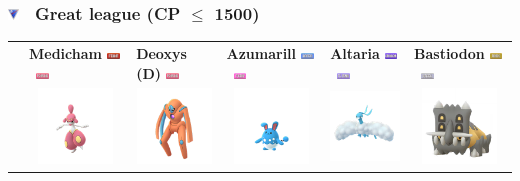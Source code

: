 \documentclass[8pt,aspectratio=169,compress]{beamer}
\newcommand{\fightingfull}{\includegraphics[height=0.15cm]{../../images/type/full/Fighting.png}}
\newcommand{\fairyfull}{\includegraphics[height=0.15cm]{../../images/type/full/Fairy.png}}
\newcommand{\flyingfull}{\includegraphics[height=0.15cm]{../../images/type/full/Flying.png}}
\newcommand{\dragonfull}{\includegraphics[height=0.15cm]{../../images/type/full/Dragon.png}}
\newcommand{\psychicfull}{\includegraphics[height=0.15cm]{../../images/type/full/Psychic.png}}
\newcommand{\rockfull}{\includegraphics[height=0.15cm]{../../images/type/full/Rock.png}}
\newcommand{\waterfull}{\includegraphics[height=0.15cm]{../../images/type/full/Water.png}}
\newcommand{\steelfull}{\includegraphics[height=0.15cm]{../../images/type/full/Steel.png}}
\begin{document}
\begin{frame}
\frametitle{\includegraphics[width=0.3cm]{../../pve/guide/great_league.png} ~Great league (CP $\leq$ 1500)}

\begin{tiny}
\begin{block}{}
\begin{center}

\begin{tabular}{rp{2cm}p{2cm}p{2cm}p{2cm}p{2cm}} 
  & \textbf{Medicham} \hfill \fightingfull~\psychicfull& \textbf{Deoxys (D)} \hfill \psychicfull & \textbf{Azumarill} \hfill\waterfull~\fairyfull &\textbf{Altaria} \hfill\dragonfull~\flyingfull &\textbf{Bastiodon} \hfill\rockfull~\steelfull  \\ 
  & \multicolumn{1}{c}{\includegraphics[width=2cm]{../../images/pokemon/medicham}} &  \multicolumn{1}{c}{\includegraphics[width=2cm]{../../images/pokemon/deoxys_d} } & \multicolumn{1}{c}{\includegraphics[width=2cm]{../../images/pokemon/azumarill} } & \multicolumn{1}{c}{\includegraphics[width=2cm]{../../images/pokemon/altaria} } & \multicolumn{1}{c}{\includegraphics[width=2cm]{../../images/pokemon/bastiodon} }  \\ \hline 

\end{tabular}
\end{center}
\end{block}
\end{tiny}
\end{frame}
\end{document}
